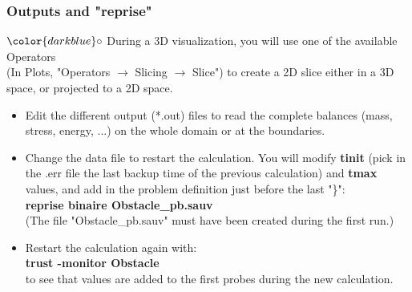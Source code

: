 \documentclass[10pt]{beamer}
\begin{document}
\begin{frame}
\frametitle{Outputs and "reprise"}
\begin{block}{}

\hspace{1cm} $\color{darkblue}\circ$ {\small{During a 3D visualization, you will use one of the available Operators \\
\hspace{1.3cm} (In Plots, "Operators $\rightarrow$ Slicing $\rightarrow$ Slice") to create a 2D slice either in a 3D \\
\hspace{1.3cm} space, or projected to a 2D space.}}

\begin{itemize}
\item Edit the different output (*.out) files to read the complete balances (mass, stress, energy, ...) on the whole domain or at the boundaries.
\vspace{0.3cm}
\item  Change the data file to restart the calculation. You will modify \textbf{tinit} (pick in the .err file the last backup time of the previous calculation) and \textbf{tmax} values, and add in the problem definition just before the last "\}":\\
\textbf{reprise binaire Obstacle\_pb.sauv}\\
(The file "Obstacle\_pb.sauv" must have been created during the first run.)
\vspace{0.3cm}
\item Restart the calculation again with:\\
\textbf{trust -monitor Obstacle}\\
to see that values are added to the first probes during the new calculation.
\end{itemize}

\end{block}
\end{frame}
\end{document}
